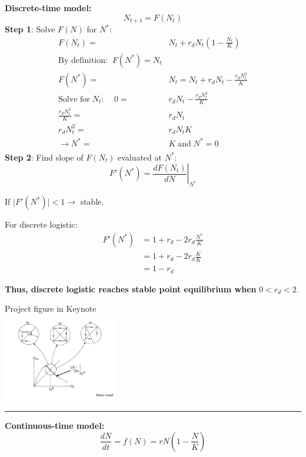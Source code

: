 \documentclass{article}
\newcommand{\note}[1]{\colorbox{gray!30}{#1}}
\newcommand{\ind}{\-\hspace{1cm}}
\begin{document}
\textbf{Discrete-time model:}
\begin{equation*}
	N_{t+1}= F(N_t)
\end{equation*}
\textbf{Step 1}:  Solve $F(N)$ for $N^*$:
\begin{align*}
	F(N_t)=& N_t+r_d N_t \left( 1-\frac{N_t}{K}\right)\\
	\text{By definition:}\; \; F(N^*)=N_t&\\
	F(N^*)=& N_t=N_t + r_d N_t - \frac{r_d N_t^2}{K}\\
	\text{Solve for} \; N_t: \;\;\;\;0=& r_d N_t-\frac{r_d N_t^2}{K}\\
	\frac{r_d N_t^2}{K}=& r_d N_t\\
	r_d N_t^2 =& r_d N_t K\\
	\to N^* =& K \; \text{and} \; N^*=0\\
\end{align*}
\textbf{Step 2}: Find slope of $F(N_t)$ evaluated at $N^*$:
\begin{equation*}
	F'(N^*)=\left.\frac{d F(N_t)}{dN}\right\vert_{N^*}
\end{equation*}
\begin{center}
\ind \ind If $\vert F'(N^*)\vert <1 \to$ stable.
\end{center}
For discrete logistic:
\begin{align*}
	F'(N^*)&=1+ r_d - 2 r_d \frac{N^*}{K}\\
	&= 1+r_d- 2 r_d \frac{K}{K}\\
	&= 1-r_d
\end{align*}
\begin{center}
\textbf{Thus, discrete logistic reaches stable point equilibrium when} $0 < r_d< 2$.
\end{center}

\begin{center}
	\note{Project figure in Keynote}\\
\includegraphics[width=5cm]{figs/RickerSlope.pdf}
\end{center}

\rule[0.5ex]{\linewidth}{1pt}

\textbf{Continuous-time model:}
\begin{equation*}
\frac{dN}{dt}=f(N)=rN\left(1-\frac{N}{K}\right)
\end{equation*}
\end{document}
